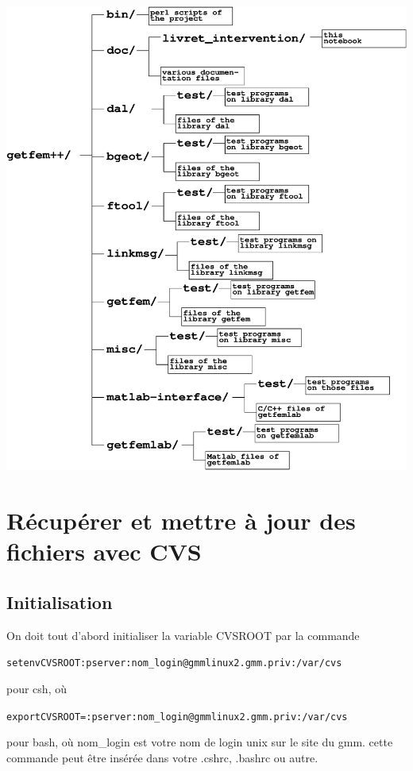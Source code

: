 \documentclass[12pt,a4paper]{../doc}
\begin{document}
{\begin{center}
\includegraphics[width=17cm,angle=0]{files_structure.eps}
\end{center}

\section{R\'ecup\'erer et mettre \`a jour des fichiers avec CVS}
\subsection{Initialisation}
On doit tout d'abord initialiser la variable CVSROOT par la commande
\begin{alltt} setenv CVSROOT :pserver:nom_login@gmmlinux2.gmm.priv:/var/cvs
\end{alltt}
pour csh, o\`u
\begin{alltt} export CVSROOT=:pserver:nom_login@gmmlinux2.gmm.priv:/var/cvs
\end{alltt}
pour bash, o\`u nom\_login est votre nom de login unix sur le site du gmm. cette commande peut \^etre ins\'er\'ee dans votre .cshrc, .bashrc ou autre. 

}
\end{document}
